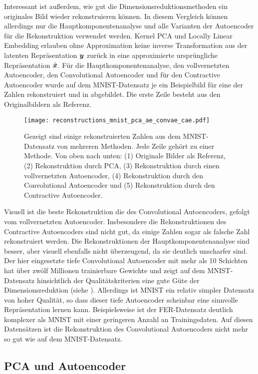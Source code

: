 Interessant ist außerdem, wie gut die Dimensionsreduktionsmethoden ein originales Bild wieder
rekonstruieren können. In diesem Vergleich können allerdings nur die Hauptkomponentenanalyse und
alle Varianten der Autoencoder für die Rekonstruktion verwendet werden. Kernel PCA und Locally
Linear Embedding erlauben ohne Approximation keine inverse Transformation aus der latenten
Repräsentation $\bm{y}$ zurück in eine approximierte ursprüngliche Repräsentation
$\hat{\bm{x}}$. Für die Hauptkomponentenanalyse, den vollvernetzten Autoencoder, den
Convolutional Autoencoder und für den Contractive Autoencoder wurde auf dem MNIST-Datensatz je ein
Beispielbild für eine der Zahlen rekonstruiert und in 
abgebildet. Die erste Zeile besteht aus den Originalbildern als Referenz.
\begin{figure}[ht]
	\centering
	\texttt{[image: reconstructions\_mnist\_pca\_ae\_convae\_cae.pdf]}
	\caption[Rekonstruierte MNIST-Zahlen]{Gezeigt sind einige rekonstruierten Zahlen aus dem MNIST-Datensatz von mehreren Methoden. Jede Zeile gehört zu einer Methode. Von oben nach unten: (1) Originale Bilder als Referenz, (2) Rekonstruktion durch PCA, (3) Rekonstruktion durch einen vollvernetzten Autoencoder, (4) Rekonstruktion durch den Convolutional Autoencoder und (5) Rekonstruktion durch den Contractive Autoencoder.}
	\label{fig:MNIST-reconstructions}
\end{figure}
Visuell ist die beste Rekonstruktion die des Convolutional Autoencoders, gefolgt vom vollvernetzten Autoencoder. Insbesondere die Rekonstruktionen des Contractive Autoencoders sind nicht gut, da einige Zahlen sogar als falsche Zahl rekonstruiert werden. Die Rekonstruktionen der Hauptkomponentenanalyse sind besser, aber visuell ebenfalls nicht überzeugend, da sie deutlich unscharfer sind. Der hier eingesetzte tiefe Convolutional Autoencoder mit mehr als 10 Schichten hat über zwölf Millionen trainierbare Gewichte und zeigt auf dem MNIST-Datensatz hinsichtlich der Qualitätskriterien eine gute Güte der Dimensionsreduktion (siehe ). Allerdings ist MNIST ein relativ simpler Datensatz von hoher Qualität, so dass dieser tiefe Autoencoder scheinbar eine sinnvolle Repräsentation lernen kann. Beispielsweise ist der FER-Datensatz deutlich komplexer als MNIST mit einer geringeren Anzahl an Trainingsdaten. Auf diesen Datensätzen ist die Rekonstruktion des Convolutional Autoencoders nicht mehr so gut wie auf dem MNIST-Datensatz.

\subsection{PCA und Autoencoder}
\label{ch:Vergleich:sec:Resultate:PCA_AE}

